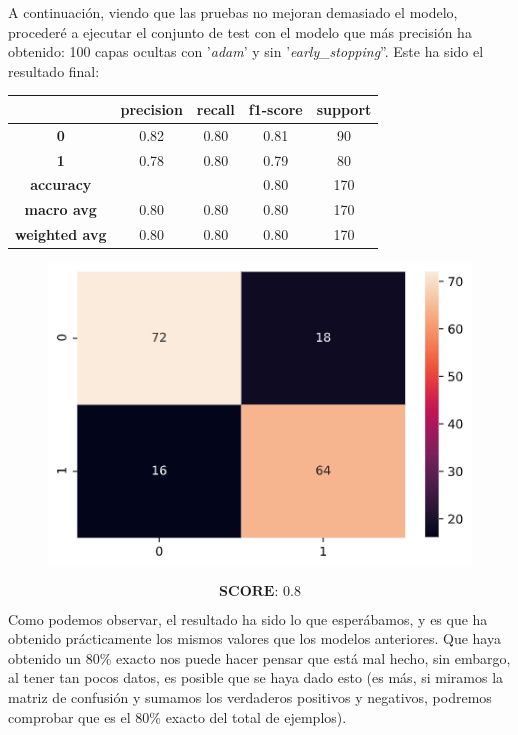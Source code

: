 \documentclass[11pt,a4paper]{article}
\begin{document}
A continuación, viendo que las pruebas no mejoran demasiado el modelo, procederé a ejecutar el conjunto de test con el modelo
que más precisión ha obtenido: 100 capas ocultas con '\textit{adam}' y sin '\textit{early\_stopping}''. Este ha sido el
resultado final:
\begin{table}[H]
    \centering
    \begin{tabular}{c|cccc}
        \textbf{} & \textbf{precision} & \textbf{recall} & \textbf{f1-score} & \textbf{support} \\ \hline
        \textbf{0} & 0.82 & 0.80 & 0.81 & 90 \\
        \textbf{1} & 0.78 & 0.80 & 0.79 & 80 \\ \hline
        \textbf{accuracy} & & & 0.80 & 170 \\
        \textbf{macro avg} & 0.80 & 0.80 & 0.80 & 170 \\
        \textbf{weighted avg} & 0.80 & 0.80 & 0.80 & 170
    \end{tabular}
\end{table}

\begin{figure}[H]
    \centering
    \includegraphics[scale=0.5]{img/matrix-test.png}    
\end{figure}
$$\textbf{SCORE:  } 0.8$$

Como podemos observar, el resultado ha sido lo que esperábamos, y es que ha obtenido prácticamente los mismos valores que los
modelos anteriores. Que haya obtenido un 80\% exacto nos puede hacer pensar que está mal hecho, sin embargo, al tener tan pocos
datos, es posible que se haya dado esto (es más, si miramos la matriz de confusión y sumamos los verdaderos positivos y
negativos, podremos comprobar que es el 80\% exacto del total de ejemplos).
\end{document}
